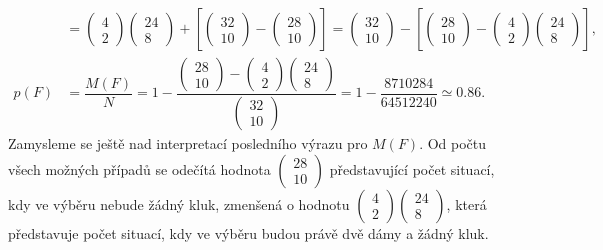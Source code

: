 \begin{example}
\begin{align*}
           &= \begin{pmatrix}  4 \\ 2 \end{pmatrix}\begin{pmatrix} 24 \\ 8 \end{pmatrix} + 
              \left[\begin{pmatrix}  32 \\ 10 \end{pmatrix} - 
                    \begin{pmatrix}  28 \\ 10 \end{pmatrix}
              \right]
            = \begin{pmatrix} 32 \\ 10 \end{pmatrix} - 
              \left[\begin{pmatrix} 28 \\ 10 \end{pmatrix} - 
                    \begin{pmatrix}  4 \\  2 \end{pmatrix}
                    \begin{pmatrix} 24 \\  8 \end{pmatrix}
              \right],                                                                          \\
      p(F) &= \dfrac{M(F)}{N}
            = 1 - \dfrac{\begin{pmatrix} 28 \\ 10 \end{pmatrix} -
                         \begin{pmatrix}  4 \\  2 \end{pmatrix}
                         \begin{pmatrix} 24 \\  8 \end{pmatrix}
                        }
                        {\begin{pmatrix} 32 \\ 10 \end{pmatrix}}
            = 1 - \dfrac{\num{8710284}}{\num{64512240}} \simeq \num{0.86}.
    \end{align*}
    Zamysleme se ještě nad interpretací posledního výrazu pro \(M(F)\). Od počtu všech možných 
    případů se odečítá hodnota \(\begin{pmatrix} 28 \\ 10 \end{pmatrix}\) představující počet 
    situací, kdy ve výběru nebude žádný kluk, zmenšená o hodnotu \(\begin{pmatrix} 4 \\ 2 
    \end{pmatrix}\begin{pmatrix} 24 \\ 8 \end{pmatrix}\), která představuje počet situací, kdy ve 
    výběru budou právě dvě dámy a žádný kluk.
  \normalsize
\end{example}